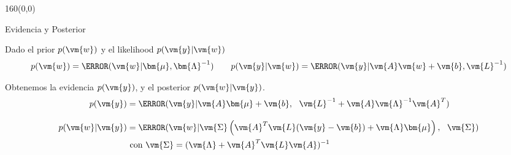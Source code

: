\documentclass[shownotes,aspectratio=169]{beamer}
\begin{document}
\begin{frame}[plain]
 \begin{textblock}{160}(0,0)
\begin{center}
 \Large Evidencia y Posterior \\
\end{center}
\end{textblock}
\vspace{1cm}

Dado el prior $p(\vm{w})$ y el likelihood $p(\vm{y}|\vm{w})$
\begin{align*}
 p(\vm{w}) =  \N(\vm{w}|\bm{\mu},\bm{\Lambda}^{-1}) \ \ \ \ \ \
   p(\vm{y}|\vm{w}) =  \N(\vm{y}|\vm{A}\vm{w}+\vm{b},\vm{L}^{-1})
\end{align*}
\vspace{0.3cm}

Obtenemos la evidencia $p(\vm{y})$, y el posterior $p(\vm{w}|\vm{y})$.
\begin{align*}
 p(\vm{y}) &= \N(\vm{y}| \vm{A}\bm{\mu} + \vm{b} , \ \   \vm{L}^{-1} + \vm{A}\vm{\Lambda}^{-1}\vm{A}^T ) \\[0.3cm]
 p(\vm{w}|\vm{y}) &= \N(\vm{w} | \vm{\Sigma}\left( \vm{A}^T \vm{L} (\vm{y}-\vm{b}) + \vm{\Lambda} \bm{\mu}  \right), \ \ \vm{\Sigma}) \\
 &  \text{ con } \vm{\Sigma} = (\vm{\Lambda} + \vm{A}^T \vm{L}\vm{A})^{-1}
\end{align*}

\end{frame}
\end{document}
